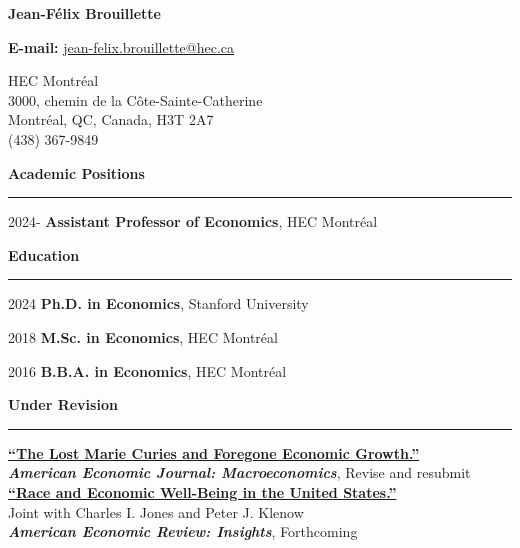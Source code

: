 \documentclass[12pt]{article}
\begin{document}
\begin{center}
{\huge \textbf{Jean-F\'elix Brouillette}} \\

\vspace{0.5cm}

\textbf{E-mail:} \href{mailto:jean-felix.brouillette@hec.ca}{jean-felix.brouillette@hec.ca} \\

\vspace{0.5cm}

\begin{small}
HEC Montr\'eal \\
3000, chemin de la C\^ote-Sainte-Catherine \\
Montr\'eal, QC, Canada, H3T 2A7 \\
(438) 367-9849
\end{small}
\end{center}

{\large \textbf{Academic Positions}} \\
\noindent\rule[0.5\baselineskip]{\textwidth}{1pt}

\begin{small}
2024- \tabto{1.5cm} \textbf{Assistant Professor of Economics}, HEC Montr\'eal
\end{small}

\vspace{0.5cm}

{\large \textbf{Education}} \\
\noindent\rule[0.5\baselineskip]{\textwidth}{1pt}

\begin{small}
2024 \tabto{1.5cm} \textbf{Ph.D. in Economics}, Stanford University

2018 \tabto{1.5cm} \textbf{M.Sc. in Economics}, HEC Montr\'eal

2016 \tabto{1.5cm} \textbf{B.B.A. in Economics}, HEC Montr\'eal
\end{small}

\vspace{0.5cm}

{\large \textbf{Under Revision}} \\
\noindent\rule[0.5\baselineskip]{\textwidth}{1pt}

\begin{small}
\href{https://jfbrou.github.io/papers/hopper.pdf}{\textbf{``The Lost Marie Curies and Foregone Economic Growth.''}} \\
\textit{\textbf{American Economic Journal: Macroeconomics}}, Revise and resubmit \\[-0.5\baselineskip]

\href{http://klenow.com/BrouilletteJonesKlenow_Race_and_Welfare.pdf}{\textbf{``Race and Economic Well-Being in the United States.''}} \\
Joint with Charles I. Jones and Peter J. Klenow \\
\textit{\textbf{American Economic Review: Insights}}, Forthcoming
\end{small}
\end{document}
